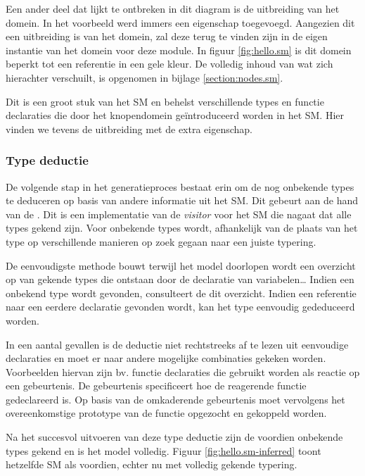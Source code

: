 Een ander deel dat lijkt te ontbreken in dit diagram is de uitbreiding van het
domein. In het voorbeeld werd immers een eigenschap  toegevoegd.
Aangezien dit een uitbreiding is van het domein, zal deze terug te vinden zijn
in de eigen instantie van het domein voor deze module. In figuur
\ref{fig:hello.sm} is dit domein beperkt tot een referentie in een gele kleur.
De volledig inhoud van wat zich hierachter verschuilt, is opgenomen in bijlage
\ref{section:nodes.sm}.

Dit is een groot stuk van het SM en behelst verschillende types en functie
declaraties die door het knopendomein ge\"introduceerd worden in het SM. Hier
vinden we tevens de uitbreiding met de extra  eigenschap.

\subsubsection{Type deductie}

De volgende stap in het generatieproces bestaat erin om de nog onbekende types
te deduceren op basis van andere informatie uit het SM. Dit gebeurt aan de hand
van de . Dit is een implementatie van de \emph{visitor}
voor het SM die nagaat dat alle types gekend zijn. Voor onbekende types wordt,
afhankelijk van de plaats van het type op verschillende manieren op zoek gegaan
naar een juiste typering.

De eenvoudigste methode bouwt terwijl het model doorlopen wordt een overzicht
op van gekende types die ontstaan door de declaratie van variabelen\dots
Indien een onbekend type wordt gevonden, consulteert de 
dit overzicht. Indien een referentie naar een eerdere declaratie gevonden
wordt, kan het type eenvoudig gededuceerd worden.

In een aantal gevallen is de deductie niet rechtstreeks af te lezen uit
eenvoudige declaraties en moet er naar andere mogelijke combinaties gekeken
worden. Voorbeelden hiervan zijn bv. functie declaraties die gebruikt worden
als reactie op een gebeurtenis. De gebeurtenis specificeert hoe de reagerende
functie gedeclareerd is. Op basis van de omkaderende gebeurtenis moet
vervolgens het overeenkomstige prototype van de functie opgezocht en gekoppeld
worden.

Na het succesvol uitvoeren van deze type deductie zijn de voordien onbekende
types gekend en is het model volledig. Figuur \ref{fig:hello.sm-inferred} toont
hetzelfde SM als voordien, echter nu met volledig gekende typering.

